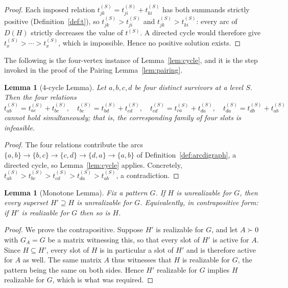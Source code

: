 \documentclass[11pt]{article}
\theoremstyle{plain}
\newtheorem{lemma}[theorem]{Lemma}
\theoremstyle{definition}
\begin{document}
\begin{aiblock}
\begin{proof}
Each imposed relation $t^{(S)}_{jk}=t^{(S)}_{ji}+t^{(S)}_{ki}$ has both summands strictly positive
(Definition~\ref{def:t}), so $t^{(S)}_{jk}>t^{(S)}_{ji}$ and $t^{(S)}_{jk}>t^{(S)}_{ki}$: every arc of
$D(H)$ strictly decreases the value of $t^{(S)}$. A directed cycle would therefore give
$t^{(S)}_x>\cdots>t^{(S)}_x$, which is impossible. Hence no positive solution exists.
\end{proof}

The following is the
four-vertex instance of Lemma~\ref{lem:cycle}, and it is the step invoked in the proof of the Pairing
Lemma~\ref{lem:pairing}.

\begin{lemma}[4-cycle Lemma]\label{lem:4cycle}
Let $a,b,c,d$ be four distinct survivors at a level $S$. Then the four relations
\[
t^{(S)}_{ab}=t^{(S)}_{ac}+t^{(S)}_{bc},\quad
t^{(S)}_{bc}=t^{(S)}_{bd}+t^{(S)}_{cd},\quad
t^{(S)}_{cd}=t^{(S)}_{ca}+t^{(S)}_{da},\quad
t^{(S)}_{da}=t^{(S)}_{db}+t^{(S)}_{ab}
\]
cannot hold simultaneously; that is, the corresponding family of four slots is infeasible.
\end{lemma}
\begin{proof}
The four relations contribute the arcs $\{a,b\}\to\{b,c\}\to\{c,d\}\to\{d,a\}\to\{a,b\}$ of
Definition~\ref{def:arcdigraph}, a directed cycle, so Lemma~\ref{lem:cycle} applies. Concretely,
$t^{(S)}_{ab}>t^{(S)}_{bc}>t^{(S)}_{cd}>t^{(S)}_{da}>t^{(S)}_{ab}$, a contradiction.
\end{proof}

\begin{lemma}[Monotone Lemma]\label{lem:monotone}
Fix a pattern $G$. If $H$ is unrealizable for $G$, then every superset $H'\supseteq H$ is unrealizable
for $G$. Equivalently, in contrapositive form: if $H'$ is realizable for $G$ then so is $H$.
\end{lemma}
\begin{proof}
We prove the contrapositive. Suppose $H'$ is realizable for $G$, and let $A\succ0$ with $G_A=G$ be a
matrix witnessing this, so that every slot of $H'$ is active for $A$. Since $H\subseteq H'$, every slot
of $H$ is in particular a slot of $H'$ and is therefore active for $A$ as well. The same matrix $A$
thus witnesses that $H$ is realizable for $G$, the pattern being the same on both sides. Hence $H'$
realizable for $G$ implies $H$ realizable for $G$, which is what was required.
\end{proof}
\end{aiblock}
\end{document}
